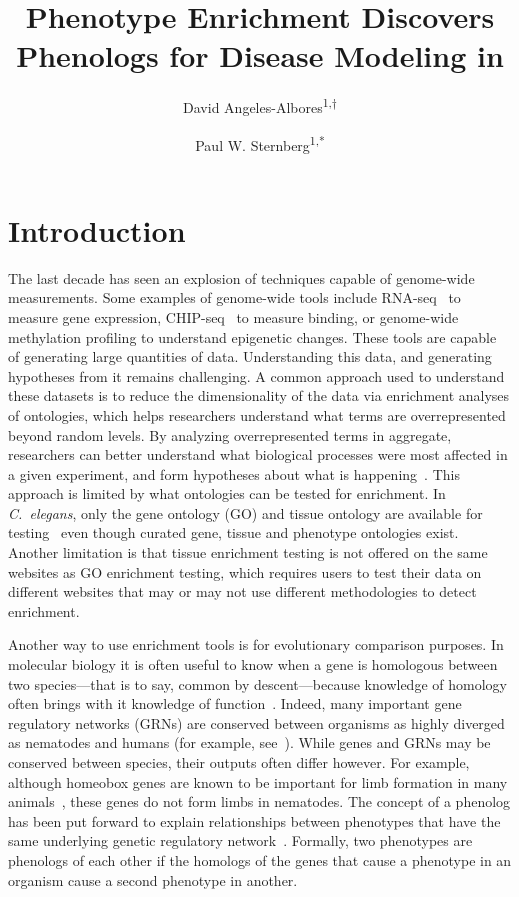 \documentclass[10pt,letterpaper,twocolumn]{article}
\title{
  \Large
  \textbf{Phenotype Enrichment Discovers Phenologs for Disease Modeling in \cel{}}
}
\author{David Angeles-Albores\textsuperscript{1,$\dagger{}$}
\and{}
Paul W. Sternberg\textsuperscript{1,*}
}
\newcommand{\cel}{\emph{C.~elegans}}
\begin{document}

\twocolumn[
\maketitle


]
\nolinenumbers{}

\section*{Introduction}
The last decade has seen an explosion of techniques capable of genome-wide
measurements. Some examples of genome-wide tools include RNA-seq~\cite{} to
measure gene expression, CHIP-seq~\cite{} to measure binding, or genome-wide
methylation profiling to understand epigenetic changes. These tools are capable
of generating large quantities of data. Understanding this data, and generating
hypotheses from it remains challenging. A common approach used to understand
these datasets is to reduce the dimensionality of the data via enrichment
analyses of ontologies, which helps researchers understand what terms are
overrepresented beyond random levels. By analyzing overrepresented terms in
aggregate, researchers can better understand what biological processes were most
affected in a given experiment, and form hypotheses about what is
happening~\cite{}. This approach is limited by what ontologies can be tested for
enrichment. In \cel{}, only the gene ontology (GO) and tissue ontology are
available for testing~\cite{} even though curated gene, tissue and phenotype
ontologies exist. Another limitation is that tissue enrichment testing
is not offered on the same websites as GO enrichment testing, which requires
users to test their data on different websites that may or may not use different
methodologies to detect enrichment.

Another way to use enrichment tools is for evolutionary comparison purposes.
In molecular biology it is often useful to know when a gene is homologous
between two species---that is to say, common by descent---because knowledge of
homology often brings with it knowledge of function~\cite{}. Indeed, many
important gene regulatory networks (GRNs) are conserved between organisms as
highly diverged as nematodes and humans (for example, see~\cite{}). While genes
and GRNs may be conserved between species, their outputs often differ however.
For example, although homeobox genes are known to be important for limb
formation in many animals~\cite{}, these genes do not form limbs in nematodes.
The concept of a phenolog has been put forward to explain relationships between
phenotypes that have the same underlying genetic regulatory network~\cite{}.
Formally, two phenotypes are phenologs of each other if the homologs of the
genes that cause a phenotype in an organism cause a second phenotype in another.
\end{document}

